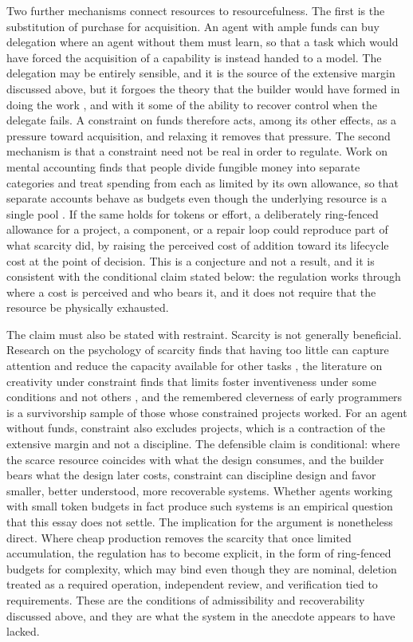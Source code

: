 \documentclass[11pt]{article}
\theoremstyle{remark}
\begin{document}
Two further mechanisms connect resources to resourcefulness. The first is the substitution of purchase for acquisition. An agent with ample funds can buy delegation where an agent without them must learn, so that a task which would have forced the acquisition of a capability is instead handed to a model. The delegation may be entirely sensible, and it is the source of the extensive margin discussed above, but it forgoes the theory that the builder would have formed in doing the work \cite{naur1985}, and with it some of the ability to recover control when the delegate fails. A constraint on funds therefore acts, among its other effects, as a pressure toward acquisition, and relaxing it removes that pressure. The second mechanism is that a constraint need not be real in order to regulate. Work on mental accounting finds that people divide fungible money into separate categories and treat spending from each as limited by its own allowance, so that separate accounts behave as budgets even though the underlying resource is a single pool \cite{thaler1999}. If the same holds for tokens or effort, a deliberately ring-fenced allowance for a project, a component, or a repair loop could reproduce part of what scarcity did, by raising the perceived cost of addition toward its lifecycle cost at the point of decision. This is a conjecture and not a result, and it is consistent with the conditional claim stated below: the regulation works through where a cost is perceived and who bears it, and it does not require that the resource be physically exhausted.

The claim must also be stated with restraint. Scarcity is not generally beneficial. Research on the psychology of scarcity finds that having too little can capture attention and reduce the capacity available for other tasks \cite{mullainathan2013}, the literature on creativity under constraint finds that limits foster inventiveness under some conditions and not others \cite{stokes2005}, and the remembered cleverness of early programmers is a survivorship sample of those whose constrained projects worked. For an agent without funds, constraint also excludes projects, which is a contraction of the extensive margin and not a discipline. The defensible claim is conditional: where the scarce resource coincides with what the design consumes, and the builder bears what the design later costs, constraint can discipline design and favor smaller, better understood, more recoverable systems. Whether agents working with small token budgets in fact produce such systems is an empirical question that this essay does not settle. The implication for the argument is nonetheless direct. Where cheap production removes the scarcity that once limited accumulation, the regulation has to become explicit, in the form of ring-fenced budgets for complexity, which may bind even though they are nominal, deletion treated as a required operation, independent review, and verification tied to requirements. These are the conditions of admissibility and recoverability discussed above, and they are what the system in the anecdote appears to have lacked.
\end{document}
